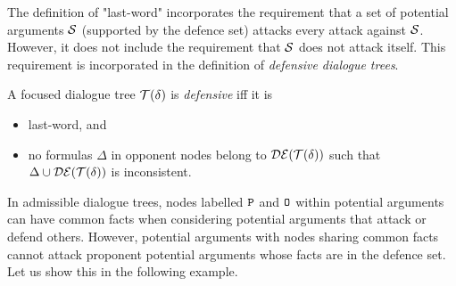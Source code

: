  The definition of "last-word" incorporates the requirement that a set of potential arguments $\mathcal{S}$ (supported by the defence set) attacks every attack against $\mathcal{S}$. However, it does not include the requirement that $\mathcal{S}$ does not attack itself. This requirement is incorporated in the definition of \emph{defensive dialogue trees}. 

\begin{definition} 
\label{def:defensive-tree}
A focused dialogue tree $\mathcal{T}(\delta)$ is \emph{defensive} iff it is
\begin{itemize}
    \item last-word, and
    \item no formulas $\Delta$ in opponent nodes belong to $\mathcal{DE}(\mathcal{T}(\delta))$ such that $\Delta \cup \mathcal{DE}(\mathcal{T}(\delta))$ is inconsistent.
\end{itemize}
\end{definition}


In admissible dialogue trees, nodes labelled $\texttt{\textup{P}}$ and $\texttt{\textup{O}}$ within potential arguments can have common facts when considering potential arguments that attack or defend others.
However, potential arguments with nodes sharing common facts cannot attack proponent potential arguments whose facts are in the defence set.
Let us show this in the following example.


